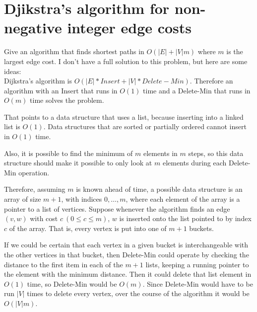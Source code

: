 \documentclass[11pt]{article}
\begin{document}
\section{Djikstra's algorithm for non-negative integer edge costs}
Give an algorithm that finds shortest paths in $O(|E| + |V|m)$ where $m$ is the largest edge cost.
I don't have a full solution to this problem, but here are some ideas: \\
Dijkstra's algorithm is $O(|E| * Insert + |V| * Delete-Min)$. Therefore an algorithm with an Insert that runs in $O(1)$ time and a Delete-Min that runs in $O(m)$ time solves the problem.
\\
\par{That points to a data structure that uses a list, because inserting into a linked list is $O(1)$. Data structures that are sorted or partially ordered cannot insert in $O(1)$ time.} \\
\par{Also, it is possible to find the minimum of $m$ elements in $m$ steps, so this data structure should make it possible to only look at $m$ elements during each Delete-Min operation.}
\par{Therefore, assuming $m$ is known ahead of time, a possible data structure is an array of size $m +1$, with indices ${0,\dots,m}$, where each element of the array is a pointer to a list of vertices. Suppose whenever the algorithm finds an edge $(v,w)$ with cost $c\ (0 \le c \le m)$, $w$ is inserted onto the list pointed to by index $c$ of the array. That is, every vertex is put into one of $m+1$ buckets.}
\par{If we could be certain that each vertex in a given bucket is interchangeable with the other vertices in that bucket, then Delete-Min could operate by checking the distance to the first item in each of the $m+1$ lists, keeping a running pointer to the element with the minimum distance. Then it could delete that list element in $O(1)$ time, so Delete-Min would be $O(m)$. Since Delete-Min would have to be run $|V|$ times to delete every vertex, over the course of the algorithm it would be $O(|V|m)$.}

\newpage
\end{document}
